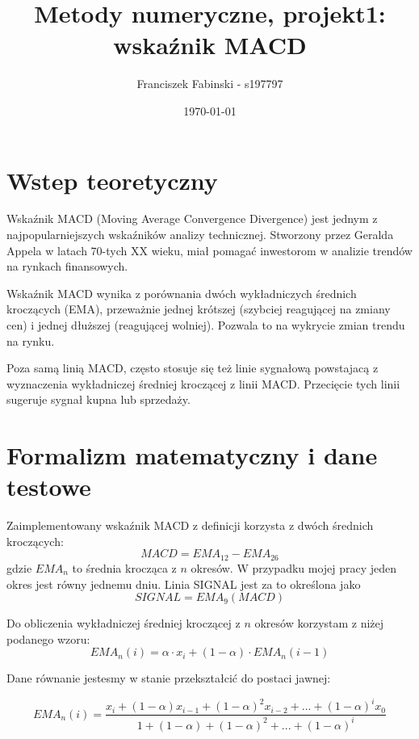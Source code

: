 \documentclass[a4paper,12pt]{article}  %
\title{Metody numeryczne, projekt1:\\ wskaźnik MACD}
\author{Franciszek Fabinski - s197797}
\date{\today}
\begin{document}
\maketitle  %

\section{Wstep teoretyczny}
Wskaźnik MACD (Moving Average Convergence Divergence) jest jednym z
najpopularniejszych wskaźników analizy technicznej. Stworzony przez 
Geralda Appela w latach 70-tych XX wieku, miał pomagać inwestorom
w analizie trendów na rynkach finansowych. 

Wskaźnik MACD wynika z porównania dwóch wykładniczych średnich kroczących (EMA), przeważnie
jednej krótszej (szybciej reagującej na zmiany cen) i jednej dłuższej
(reagującej wolniej). Pozwala to na wykrycie zmian trendu na rynku.

Poza samą linią MACD, często stosuje się też linie sygnałową powstajacą
z wyznaczenia wykładniczej średniej kroczącej z linii MACD. Przecięcie tych linii 
sugeruje sygnał kupna lub sprzedaży.

\section{Formalizm matematyczny i dane testowe}
Zaimplementowany wskaźnik MACD z definicji korzysta z dwóch średnich kroczących:
\begin{equation}
    MACD = EMA_{12} - EMA_{26}
\end{equation}
gdzie $EMA_{n}$ to średnia krocząca z $n$ okresów.
W przypadku mojej pracy jeden okres jest równy jednemu dniu.
Linia SIGNAL jest za to określona jako
\begin{equation}
    SIGNAL = EMA_{9}(MACD)
\end{equation}


\pagebreak


Do obliczenia wykładniczej średniej kroczącej z $n$ okresów korzystam z niżej
podanego wzoru:
\begin{equation}
    EMA_{n}(i) = \alpha \cdot x_i + (1 - \alpha) \cdot EMA_{n}(i-1)
\end{equation}


Dane równanie jestesmy w stanie przekształcić do postaci jawnej:

\begin{equation}
  EMA_n(i) = \frac{x_i + (1-\alpha)x_{i-1} + (1-\alpha)^2 x_{i-2} + ... +
  (1-\alpha)^i x_0}{1 + (1-\alpha) + (1-\alpha)^2 + ... + (1-\alpha)^i}
\end{equation}
\end{document}
